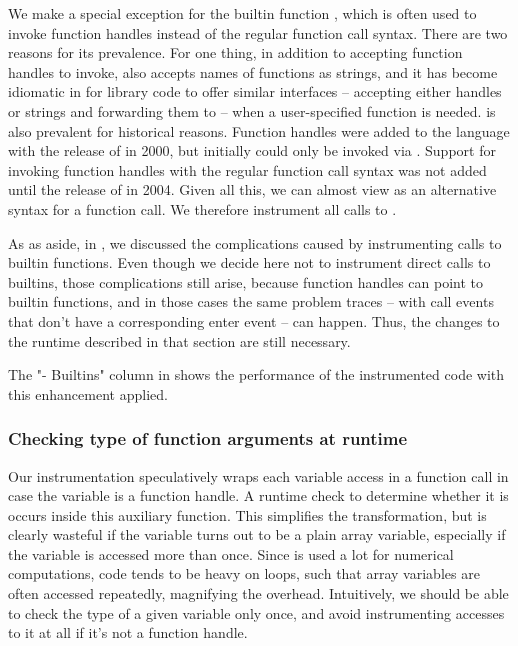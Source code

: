 We make a special exception for the builtin function , which is
often used to invoke function handles instead of the regular function call
syntax. There are two reasons for its prevalence. For one thing, in addition to
accepting function handles to invoke,  also accepts names of
functions as strings, and it has become idiomatic in \matlab for library code
to offer similar interfaces -- accepting either handles or strings and
forwarding them to  -- when a user-specified function is needed.
 is also prevalent for historical reasons. Function handles were
added to the language with the release of  in 2000, but initially
could only be invoked via . Support for invoking function handles
with the regular function call syntax was not added until the release of
 in 2004. Given all this, we can almost view  as an
alternative syntax for a function call. We therefore instrument all calls to
.

As as aside, in , we discussed the complications
caused by instrumenting calls to builtin functions. Even though we decide here
not to instrument direct calls to builtins, those complications still arise,
because function handles can point to builtin functions, and in those cases the
same problem traces -- with call events that don't have a corresponding enter
event -- can happen. Thus, the changes to the runtime described in that section
are still necessary.

The "- Builtins" column in  shows the
performance of the instrumented code with this enhancement applied.

\subsubsection{Checking type of function arguments at runtime}

Our instrumentation speculatively wraps each variable access in a function call
in case the variable is a function handle. A runtime check to determine whether
it is occurs inside this auxiliary function. This simplifies the
transformation, but is clearly wasteful if the variable turns out to be a plain
array variable, especially if the variable is accessed more than once. Since
\matlab is used a lot for numerical computations, \matlab code tends to be
heavy on loops, such that array variables are often accessed repeatedly,
magnifying the overhead. Intuitively, we should be able to check the type of a
given variable only once, and avoid instrumenting accesses to it at all if it's
not a function handle.

